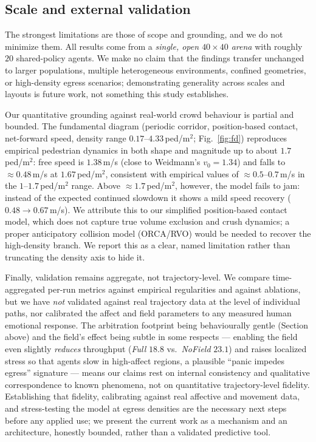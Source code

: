 \documentclass[sigconf,nonacm]{acmart}
\begin{document}
\subsection{Scale and external validation}

The strongest limitations are those of scope and grounding, and we do not minimize them. All results come from a \emph{single, open $40\times40$ arena} with roughly $20$ shared-policy agents. We make no claim that the findings transfer unchanged to larger populations, multiple heterogeneous environments, confined geometries, or high-density egress scenarios; demonstrating generality across scales and layouts is future work, not something this study establishes.

Our quantitative grounding against real-world crowd behaviour is partial and bounded. The fundamental diagram (periodic corridor, position-based contact, net-forward speed, density range $0.17$--$4.33$\,ped/m$^2$; Fig.~\ref{fig:fd}) reproduces empirical pedestrian dynamics in both shape and magnitude up to about $1.7$\,ped/m$^2$: free speed is $1.38$\,m/s (close to Weidmann's $v_0 = 1.34$) and falls to $\approx 0.48$\,m/s at $1.67$\,ped/m$^2$, consistent with empirical values of $\approx 0.5$--$0.7$\,m/s in the $1$--$1.7$\,ped/m$^2$ range. Above $\approx 1.7$\,ped/m$^2$, however, the model fails to jam: instead of the expected continued slowdown it shows a mild speed recovery ($0.48 \to 0.67$\,m/s). We attribute this to our simplified position-based contact model, which does not capture true volume exclusion and crush dynamics; a proper anticipatory collision model (ORCA/RVO) would be needed to recover the high-density branch. We report this as a clear, named limitation rather than truncating the density axis to hide it.

Finally, validation remains aggregate, not trajectory-level. We compare time-aggregated per-run metrics against empirical regularities and against ablations, but we have \emph{not} validated against real trajectory data at the level of individual paths, nor calibrated the affect and field parameters to any measured human emotional response. The arbitration footprint being behaviourally gentle (Section above) and the field's effect being subtle in some respects --- enabling the field even slightly \emph{reduces} throughput (\emph{Full} $18.8$ vs.\ \emph{NoField} $23.1$) and raises localized stress so that agents slow in high-affect regions, a plausible ``panic impedes egress'' signature --- means our claims rest on internal consistency and qualitative correspondence to known phenomena, not on quantitative trajectory-level fidelity. Establishing that fidelity, calibrating against real affective and movement data, and stress-testing the model at egress densities are the necessary next steps before any applied use; we present the current work as a mechanism and an architecture, honestly bounded, rather than a validated predictive tool.
\end{document}
